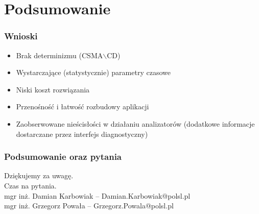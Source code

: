 \documentclass[ucs]{beamer}
\begin{document}
\section{Podsumowanie}
\begin{frame}
\frametitle{Wnioski}
\begin{itemize}
\setlength{\itemsep}{5pt}
\setlength{\parskip}{5pt}
\setlength{\parsep}{5pt}
\item Brak determinizmu (CSMA$\backslash$CD)
\item Wystarczające (statystycznie) parametry czasowe
\item Niski koszt rozwiązania
\item Przenośność i łatwość rozbudowy aplikacji
\item Zaobserwowane nieścisłości w działaniu analizatorów (dodatkowe informacje dostarczane przez interfejs diagnostyczny)
\end{itemize}
\end{frame}

\begin{frame}
\frametitle{Podsumowanie oraz pytania}
Dziękujemy za uwagę.
\\\vspace{2cm}
Czas na pytania.
\\\vspace{2cm}
mgr inż. Damian Karbowiak -- Damian.Karbowiak@polsl.pl\\
mgr inż. Grzegorz Powała -- Grzegorz.Powala@polsl.pl
\end{frame}
\end{document}
